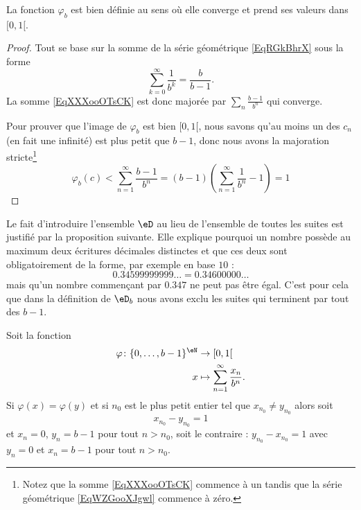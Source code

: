 \begin{lemma}
    La fonction \( \varphi_b\) est bien définie au sens où elle converge et prend ses valeurs dans \( \mathopen[ 0 , 1 [\).
\end{lemma}
    
\begin{proof}
    Tout se base sur la somme de la série géométrique \eqref{EqRGkBhrX} sous la forme
    \begin{equation}    \label{EqWZGooXJgwl}
        \sum_{k=0}^{\infty}\frac{1}{ b^k }=\frac{ b }{ b-1 }.
    \end{equation}
    La somme \eqref{EqXXXooOTsCK} est donc majorée par \( \sum_n\frac{ b-1 }{ b^n }\) qui converge.

    Pour prouver que l'image de \( \varphi_b\) est bien \( \mathopen[ 0 , 1 [\), nous savons qu'au moins un des \( c_n\) (en fait une infinité) est plus petit que \( b-1\), donc nous avons la majoration stricte\footnote{Notez que la somme \eqref{EqXXXooOTsCK} commence à un tandis que la série géométrique \eqref{EqWZGooXJgwl} commence à zéro.}
        \begin{equation}
            \varphi_b(c)<\sum_{n=1}^{\infty}\frac{ b-1 }{ b^n }=(b-1)\left( \sum_{n=1}^{\infty}\frac{1}{ b^n }-1 \right)=1
        \end{equation}
\end{proof}

Le fait d'introduire l'ensemble \( \eD\) au lieu de l'ensemble de toutes les suites est justifié par la proposition suivante. Elle explique pourquoi un nombre possède au maximum deux écritures décimales distinctes et que ces deux sont obligatoirement de la forme, par exemple en base \( 10\) :
\begin{equation}
    0.34599999999\ldots=0.34600000\ldots
\end{equation}
mais qu'un nombre commençant par \( 0.347\) ne peut pas être égal. C'est pour cela que dans la définition de \( \eD_b\) nous avons exclu les suites qui terminent par tout des \( b-1\).
\begin{proposition} \label{PropSAOoofRlQR}
    Soit la fonction
    \begin{equation}
        \begin{aligned}
            \varphi\colon \{ 0,\ldots, b-1 \}^{\eN}&\to \mathopen[ 0 , 1 [ \\
                x&\mapsto \sum_{n=1}^{\infty}\frac{ x_n }{ b^n }. 
        \end{aligned}
    \end{equation}
    Si \( \varphi(x)=\varphi(y)\) et si \( n_0\) est le plus petit entier tel que \( x_{n_0}\neq y_{n_0}\) alors soit
    \begin{equation}
        x_{n_0}-y_{n_0}=1
    \end{equation}
    et \( x_n=0\), \( y_n=b-1\) pour tout \( n>n_0\), soit le contraire : \( y_{n_0}-x_{n_0}=1\) avec \( y_n=0\) et \( x_n=b-1\) pour tout \( n>n_0\).
\end{proposition}

